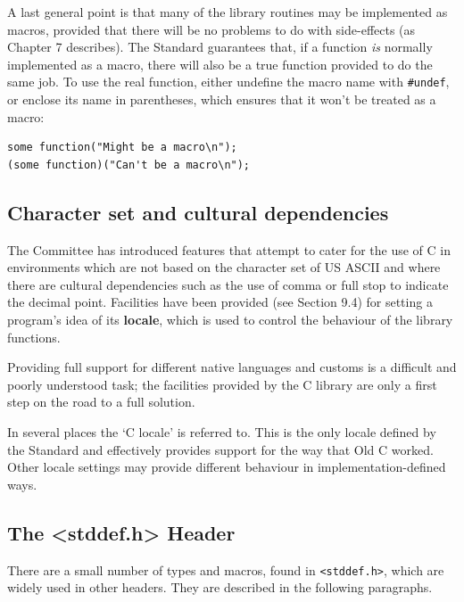    A last general point is that many of  the  library  routines
    may be implemented as macros, provided that there will be no
    problems to do with side-effects (as Chapter 7 describes).
    The  Standard  guarantees  that,  if  a function \textit{is} normally
    implemented as a macro, there will also be a  true  function
    provided  to  do  the  same  job.  To use the real function,
    either undefine the macro name with \texttt{\#undef}, or  enclose  its
    name  in parentheses, which ensures that it won't be treated
    as a macro:


   \begin{Verbatim}
some function("Might be a macro\n");
(some function)("Can't be a macro\n");
\end{Verbatim}

  

  \subsection{Character set and cultural dependencies}
   

   The Committee has introduced features that attempt to cater
    for the use of C in environments which are not based on the
    character set of US ASCII and where there are cultural
    dependencies such as the use of comma or full stop to
    indicate the decimal point.  Facilities have been provided
    (see Section 9.4) for setting a program's idea of its
    \textbf{locale}, which is used to control the behaviour of the
    library functions.


   Providing full support for different native languages and
    customs is a difficult and poorly understood task; the
    facilities provided by the C library are only a first step
    on the road to a full solution.


   In several places the `C locale' is referred to.  This is
    the only locale defined by the Standard and effectively
    provides support for the way that Old C worked.  Other
    locale settings may provide different behaviour in
    implementation-defined ways.


  

  \subsection{The <stddef.h> Header}
   

   There are a small number of types and macros, found in
    \texttt{<stddef.h>}, which are widely used in other headers.
    They are described in the following paragraphs.


